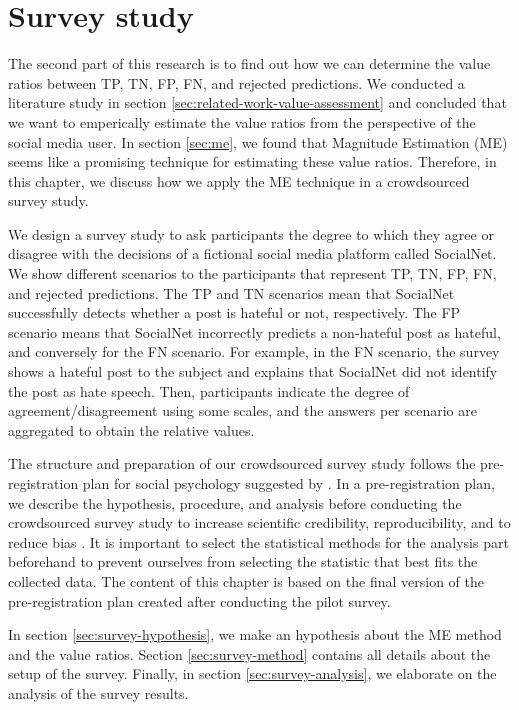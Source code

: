 \chapter{Survey study}
\label{sec:survey}
The second part of this research is to find out how we can determine the value ratios between TP, TN, FP, FN, and rejected predictions.
%
We conducted a literature study in section \ref{sec:related-work-value-assessment} and concluded that we want to emperically estimate the value ratios from the perspective of the social media user.
%
In section \ref{sec:me}, we found that Magnitude Estimation (ME) seems like a promising technique for estimating these value ratios.
%
Therefore, in this chapter, we discuss how we apply the ME technique in a crowdsourced survey study.
%

%
We design a survey study to ask participants the degree to which they agree or disagree with the decisions of a fictional social media platform called SocialNet.
%
We show different scenarios to the participants that represent TP, TN, FP, FN, and rejected predictions.
%
The TP and TN scenarios mean that SocialNet successfully detects whether a post is hateful or not, respectively.
%
The FP scenario means that SocialNet incorrectly predicts a non-hateful post as hateful, and conversely for the FN scenario.
%
For example, in the FN scenario, the survey shows a hateful post to the subject and explains that SocialNet did not identify the post as hate speech.
%
Then, participants indicate the degree of agreement/disagreement using some scales, and the answers per scenario are aggregated to obtain the relative values.
%

%
The structure and preparation of our crowdsourced survey study follows the pre-registration plan for social psychology suggested by \citet{van2016pre}.
%
In a pre-registration plan, we describe the hypothesis, procedure, and analysis before conducting the crowdsourced survey study to increase scientific credibility, reproducibility, and to reduce bias \citep{van2016pre}.
%
It is important to select the statistical methods for the analysis part beforehand to prevent ourselves from selecting the statistic that best fits the collected data.
%
The content of this chapter is based on the final version of the pre-registration plan created after conducting the pilot survey.
%

%
In section \ref{sec:survey-hypothesis}, we make an hypothesis about the ME method and the value ratios.
%
Section \ref{sec:survey-method} contains all details about the setup of the survey.
%
Finally, in section \ref{sec:survey-analysis}, we elaborate on the analysis of the survey results.

